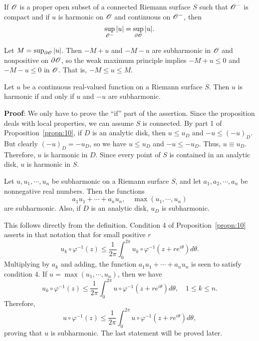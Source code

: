 \documentclass[a4paper,11pt]{article}
\begin{document}
\begin{cor}
  If ${\mathscr{O}}$ is a proper open subset of a connected Riemann surface $S$
  such that ${\mathscr{O}}^-$ is compact and if $u$ is harmonic on ${\mathscr{O}}$ and
  continuous on ${\mathscr{O}}^-$, then 
  $$
  \sup_{{\mathscr{O}}^-} |u| = \sup_{\partial{\mathscr{O}}} |u|.
  $$
\end{cor}

\begin{myproof}
  Let $M = \sup_{\partial {\mathscr{O}}}|u|$.  Then $-M+u$ and $-M-u$ are subharmonic
  in ${\mathscr{O}}$ and nonpositive on $\partial{\mathscr{O}}$, so the weak maximum principle
  implies $-M+u \le 0$ and $-M-u\le 0$ in ${\mathscr{O}}$.  That is, $-M \le u
  \le M$.
\end{myproof}

\begin{propn}
  \label{propn:11}
  Let $u$ be a continuous real-valued function on a Riemann surface
  $S$.  Then $u$ is harmonic if and only if $u$ and $-u$ are
  subharmonic.
\end{propn}

\begin{mdframed}
  \textbf{Proof}:
  We only have to prove the ``if'' part of the assertion.  Since the
  proposition deals with local properties, we can assume $S$ is
  connected.  By part 1 of Proposition~\ref{propn:10}, if $D$ is an
  analytic disk, then $u \le u_D$ and $-u \le (-u)_D$.  But clearly
  $(-u)_D = -u_D$, so we have $u \le u_D$ and $-u \le -u_D$.  Thus, $u
  \equiv u_D$.  Therefore, $u$ is harmonic in $D$.  Since every point
  of $S$ is contained in an analytic disk, $u$ is harmonic in $S$.
\end{mdframed}

\begin{propn}
  \label{propn:12}
  Let $u, u_1, \cdots, u_n$ be subharmonic on a Riemann surface
  $S$, and let $a_1, a_2, \cdots, a_n$ be nonnegative real numbers.
  Then the functions
  $$
  a_1 u_1 + \cdots + a_n u_n,\quad \max(u_1,\cdots,u_n)
  $$
  are subharmonic.  Also, if $D$ is an analytic disk, $u_D$ is
  subharmonic.
\end{propn}

\begin{myproof}
  This follows directly from the definition.  Condition 4 of
  Proposition~\ref{propn:10} asserts in that notation that for small
  positive $r$
  $$
  u_k \circ \varphi^{-1}(z) \le \frac{1}{2\pi} \int_0^{2\pi} u_k \circ
  \varphi^{-1}(z + re^{i\theta}) d\theta.
  $$
  Multiplying by $a_k$ and adding, the function $a_1 u_1 + \cdots +
  a_n u_n$ is seen to satisfy condition 4.  If $u = \max(u_1, \cdots,
  u_n)$, then we have
  $$
  u_k \circ \varphi^{-1}(z) \le \frac{1}{2\pi} \int_0^{2\pi}
  u \circ \varphi^{-1}(z+re^{i\theta}) d \theta,\quad 1 \le k \le n.
  $$
  Therefore,
  $$
  u \circ \varphi^{-1}(z) \le \frac{1}{2\pi} \int_0^{2\pi}
  u \circ \varphi^{-1}(z + re^{i\theta}) d \theta,
  $$
  proving that $u$ is subharmonic.  The last statement will be proved
  later.
\end{myproof}
\end{document}
